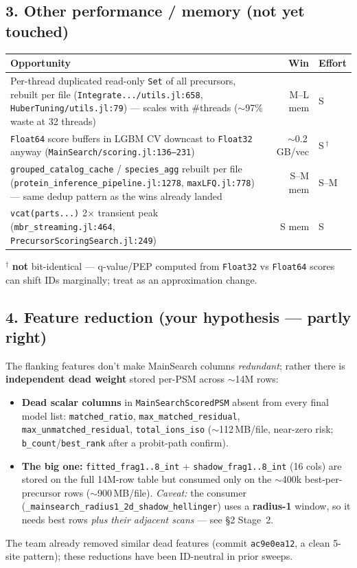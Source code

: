 \documentclass[11pt]{article}
\newcommand{\code}[1]{\texttt{\small #1}}
\begin{document}
\subsection*{3. Other performance / memory (not yet touched)}
\begin{center}
\begin{tabular}{p{}rl}
\toprule
\textbf{Opportunity} & \textbf{Win} & \textbf{Effort} \\
\midrule
Per-thread duplicated read-only \code{Set} of all precursors, rebuilt per file
(\code{Integrate.../utils.jl:658}, \code{HuberTuning/utils.jl:79}) --- scales with
\#threads ($\sim$97\% waste at 32 threads) & M--L mem & S \\
\code{Float64} score buffers in LGBM CV downcast to \code{Float32} anyway
(\code{MainSearch/scoring.jl:136--231}) & $\sim$0.2\,GB/vec & S\,$^\dagger$ \\
\code{grouped\_catalog\_cache} / \code{species\_agg} rebuilt per file
(\code{protein\_inference\_pipeline.jl:1278}, \code{maxLFQ.jl:778}) --- same dedup
pattern as the wins already landed & S--M mem & S--M \\
\code{vcat(parts...)} 2$\times$ transient peak (\code{mbr\_streaming.jl:464},
\code{PrecursorScoringSearch.jl:249}) & S mem & S \\
\bottomrule
\end{tabular}
\end{center}
\footnotesize $^\dagger$ \textbf{not} bit-identical --- q-value/PEP computed from \code{Float32}
vs \code{Float64} scores can shift IDs marginally; treat as an approximation change. \normalsize

\subsection*{4. Feature reduction (your hypothesis --- partly right)}
The flanking features don't make MainSearch columns \emph{redundant}; rather there is
\textbf{independent dead weight} stored per-PSM across $\sim$14M rows:
\begin{itemize}
  \item \textbf{Dead scalar columns} in \code{MainSearchScoredPSM} absent from every final
  model list: \code{matched\_ratio}, \code{max\_matched\_residual},
  \code{max\_unmatched\_residual}, \code{total\_ions\_iso} ($\sim$112\,MB/file, near-zero
  risk; \code{b\_count}/\code{best\_rank} after a probit-path confirm).
  \item \textbf{The big one:} \code{fitted\_frag1..8\_int} + \code{shadow\_frag1..8\_int}
  (16 cols) are stored on the full 14M-row table but consumed only on the $\sim$400k
  best-per-precursor rows ($\sim$900\,MB/file). \emph{Caveat:} the consumer
  (\code{\_mainsearch\_radius1\_2d\_shadow\_hellinger}) uses a \textbf{radius-1} window, so
  it needs best rows \emph{plus their adjacent scans} --- see \S2 Stage~2.
\end{itemize}
The team already removed similar dead features (commit \code{ac9e0ea12}, a clean 5-site
pattern); these reductions have been ID-neutral in prior sweeps.
\end{document}
